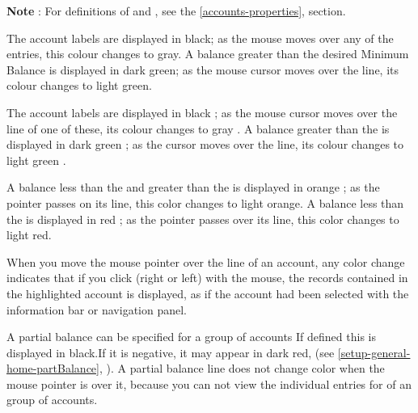 

\textbf{Note} : For definitions of  and , see the \vref{accounts-properties},  section.


The account labels are displayed in black; as the mouse moves over any of the entries, this colour changes to gray.
A balance greater than the desired Minimum Balance is displayed in dark green; as the mouse cursor moves over the line, its colour changes to light green.


The account labels are displayed in black{\couleur} ; as the mouse cursor moves over the line of one of these, its colour changes to gray {\couleur}.
A balance greater than the    is displayed in dark green {\couleur} ; as the cursor moves over the line, its colour changes to light green {\couleur}.



A balance less than the  and greater than the  is displayed in orange{\couleur} ; as the pointer passes on its line, this color changes to light orange{\couleur}.
A balance less than the    is displayed in red{\couleur} ; as the pointer passes over its line, this color changes to light red{\couleur}.

When you move the mouse pointer over the line of an account, any color change indicates that if you click (right or left) with the mouse, the records contained in the highlighted account is displayed, as if the account had been selected with the information bar or navigation panel.

A partial balance can be specified for a group of accounts  If defined this is displayed in black{\couleur}.If it is negative, it may appear in dark red{\couleur}, (see  \vref{setup-general-home-partBalance}, ). A partial balance line does not change color when the mouse pointer is over it, because you can not view the individual entries for of an group of accounts.

